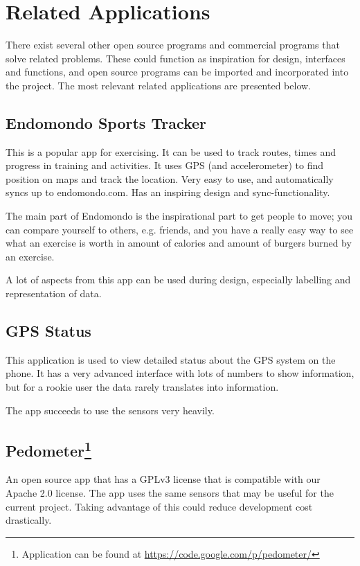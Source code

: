 \section{Related Applications}
There exist several other open source programs and commercial programs that solve related problems. These could function as inspiration for design, interfaces and functions, and open source programs can be imported and incorporated into the project. The most relevant related applications are presented below.

\subsection{Endomondo Sports Tracker}
This is a popular app for exercising. It can be used to track routes, times and progress in training and activities. It uses GPS (and accelerometer) to find position on maps and track the location. Very easy to use, and automatically syncs up to endomondo.com. Has an inspiring design and sync-functionality.

The main part of Endomondo is the inspirational part to get people to move; you can compare yourself to others, e.g. friends, and you have a really easy way to see what an exercise is worth in amount of calories and amount of burgers burned by an exercise.

A lot of aspects from this app can be used during design, especially labelling and representation of data.

\subsection{GPS Status}
This application is used to view detailed status about the GPS system on the phone. It has a very advanced interface with lots of numbers to show information, but for a rookie user the data rarely translates into information.

The app succeeds to use the sensors very heavily.

\subsection{Pedometer\footnote{Application can be found at \url{https://code.google.com/p/pedometer/}}}
An open source app that has a GPLv3 license that is compatible with our Apache 2.0 license. The app uses the same sensors that may be useful for the current project. Taking advantage of this could reduce development cost drastically.

